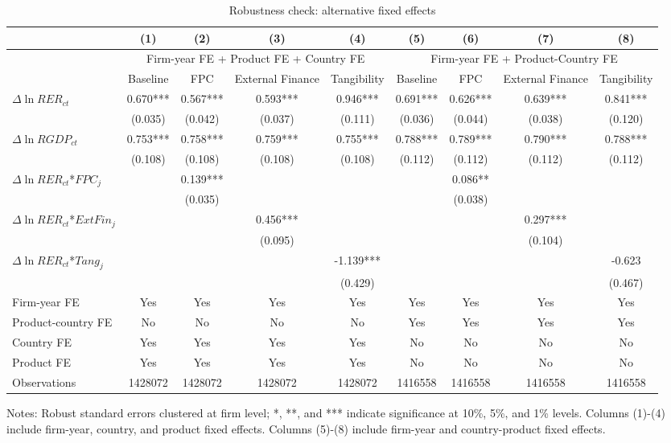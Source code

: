 \begin{table}
	\centering
	\caption{Robustness check: alternative fixed effects}
	\begin{threeparttable}
		\begin{tabular}{lcccccccc}
			\toprule
			& (1)   & (2)   & (3)   & (4) &  (5)  &  (6)  & (7)  & (8)\\
			\midrule
			& \multicolumn{4}{c}{Firm-year FE + Product FE + Country FE} & \multicolumn{4}{c}{Firm-year FE + Product-Country FE}\\
			& Baseline & FPC   & External Finance & Tangibility & Baseline & FPC & External Finance & Tangibility\\
			\midrule
			$\Delta \ln RER_{ct}$ & 0.670*** & 0.567*** & 0.593*** & 0.946*** & 0.691*** & 0.626*** & 0.639*** & 0.841*** \\
                & (0.035) & (0.042) & (0.037) & (0.111) & (0.036) & (0.044) & (0.038) & (0.120) \\
			$\Delta \ln RGDP_{ct}$ & 0.753*** & 0.758*** & 0.759*** & 0.755*** & 0.788*** & 0.789*** & 0.790*** & 0.788*** \\
			& (0.108) & (0.108) & (0.108) & (0.108) & (0.112) & (0.112) & (0.112) & (0.112) \\
			$\Delta \ln RER_{ct}$*$FPC_{j}$ &  & 0.139*** &       &       &       & 0.086** &       &  \\
			&  & (0.035) &       &       &       & (0.038) &       &  \\
			$\Delta \ln RER_{ct}$*$ExtFin_{j}$ &   &       & 0.456*** &       &       &       & 0.297*** &  \\
			&  &       & (0.095) &       &       &       & (0.104) &  \\
			$\Delta \ln RER_{ct}$*$Tang_{j}$ &   &       &       & -1.139*** &       &       &       & -0.623 \\
			&   &       &       & (0.429) &       &       &       & (0.467) \\
			Firm-year FE  &  Yes   & Yes   & Yes & Yes & Yes & Yes & Yes & Yes\\
			Product-country FE & No & No & No & No & Yes & Yes & Yes & Yes\\
			Country FE &  Yes   & Yes   & Yes   & Yes & No & No & No & No\\
			Product FE &  Yes   & Yes   & Yes   & Yes & No & No & No & No\\
			Observations & 1428072 & 1428072 & 1428072 & 1428072 & 1416558 & 1416558 & 1416558 & 1416558 \\
			\bottomrule
		\end{tabular}
		\begin{tablenotes}
			\footnotesize
			\item Notes: Robust standard errors clustered at firm level; *, **, and *** indicate significance at 10\%, 5\%, and 1\% levels. Columns (1)-(4) include firm-year, country, and product fixed effects.  Columns (5)-(8) include firm-year and country-product fixed effects.
		\end{tablenotes}
	\end{threeparttable}
	\label{tab.robust.fe}
\end{table}

